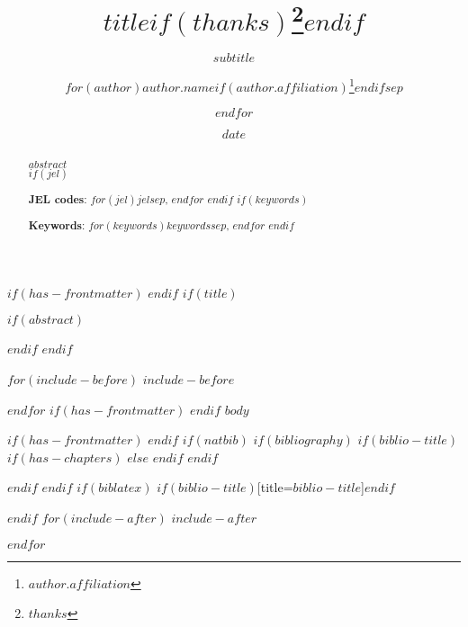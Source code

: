 \documentclass[
  12pt,
$if(lang)$
  $babel-lang$,
$endif$
a4paper
$for(classoption)$
  $classoption$$sep$,
$endfor$
]{article}
\title{$title$$if(thanks)$\thanks{$thanks$}$endif$}
\subtitle{$subtitle$}
\author{
  $for(author)$$author.name$$if(author.affiliation)$\thanks{
    $author.affiliation$
  }$endif$$sep$ \and
  $endfor$
}
\date{$date$}
\begin{document}
$if(has-frontmatter)$
\frontmatter
$endif$
$if(title)$
\maketitle
\thispagestyle{empty} %
$if(abstract)$
\begin{abstract}
  \noindent $abstract$\\
  $if(jel)$

  \noindent \textbf{JEL codes}: $for(jel)$$jel$$sep$, $endfor$
  $endif$
  $if(keywords)$

  \noindent \textbf{Keywords}: $for(keywords)$$keywords$$sep$, $endfor$
  $endif$
\end{abstract}
\restoregeometry
$endif$
$endif$

$for(include-before)$
$include-before$

$endfor$
$if(has-frontmatter)$
\mainmatter
$endif$
$body$

$if(has-frontmatter)$
\backmatter
$endif$
$if(natbib)$
$if(bibliography)$
$if(biblio-title)$
$if(has-chapters)$
\renewcommand\bibname{$biblio-title$}
$else$
\renewcommand\refname{$biblio-title$}
$endif$
$endif$
  

$endif$
$endif$
$if(biblatex)$
\printbibliography$if(biblio-title)$[title=$biblio-title$]$endif$

$endif$
$for(include-after)$
$include-after$

$endfor$
\end{document}
